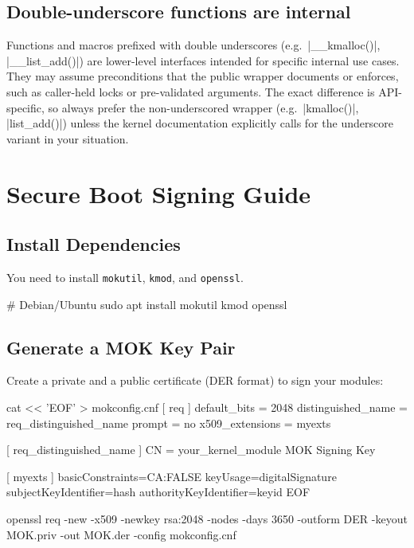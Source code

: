 \documentclass[10pt, oneside]{book}
\begin{document}
\subsection{Double-underscore functions are internal}
\label{sec:double_underscore}
Functions and macros prefixed with double underscores (e.g.\ \cpp|__kmalloc()|, \cpp|__list_add()|) are lower-level interfaces intended for specific internal use cases.
They may assume preconditions that the public wrapper documents or enforces, such as caller-held locks or pre-validated arguments.
The exact difference is API-specific, so always prefer the non-underscored wrapper (e.g.\ \cpp|kmalloc()|, \cpp|list_add()|) unless the kernel documentation explicitly calls for the underscore variant in your situation.

\section{Secure Boot Signing Guide}
\label{sec:secure_boot_signing_guide}

\subsection{Install Dependencies}
You need to install \verb|mokutil|, \verb|kmod|, and \verb|openssl|.

\begin{codebash}
# Debian/Ubuntu
sudo apt install mokutil kmod openssl
\end{codebash}

\subsection{Generate a MOK Key Pair}
Create a private and a public certificate (DER format) to sign your modules:

\begin{codebash}
cat << 'EOF' > mokconfig.cnf
[ req ]
default_bits       = 2048
distinguished_name = req_distinguished_name
prompt             = no
x509_extensions    = myexts

[ req_distinguished_name ]
CN = your_kernel_module MOK Signing Key

[ myexts ]
basicConstraints=CA:FALSE
keyUsage=digitalSignature
subjectKeyIdentifier=hash
authorityKeyIdentifier=keyid
EOF

openssl req -new -x509 -newkey rsa:2048 -nodes -days 3650 -outform DER -keyout MOK.priv -out MOK.der -config mokconfig.cnf
\end{codebash}
\end{document}
